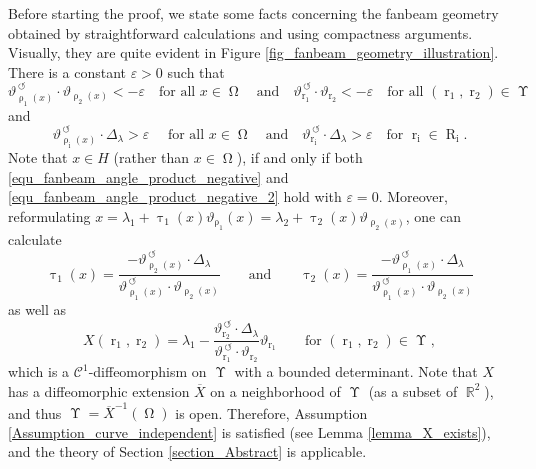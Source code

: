 \documentclass[12pt]{article}
\DeclareMathOperator{\projvariable}{i}
\DeclareMathOperator{\Xgroundset}{\Upsilon}
\DeclareMathOperator{\RR}{{\mathbb{R}}}
\DeclareMathOperator{\rotated}{\,\circlearrowleft}
\DeclareMathOperator{\rayvariable}{r}
\DeclareMathOperator{\raygroundset}{R}
\DeclareMathOperator{\tinverse}{\tau}
\DeclareMathOperator{\rayinverse}{\rho}
\DeclareMathOperator{\imgdom}{{\Omega}}
\begin{document}
Before starting the proof, we state some facts concerning the fanbeam geometry obtained by straightforward calculations and using compactness arguments. Visually, they are quite evident in Figure \ref{fig_fanbeam_geometry_illustration}.
There is a constant $\varepsilon>0$ such that
\begin{equation}\label{equ_fanbeam_angle_product_negative}
\vartheta_{\rayinverse_1(x)}^{\rotated}\cdot \vartheta_{\rayinverse_2(x)} {<}-\varepsilon  \quad \text{for all }x\in \imgdom \quad \text{and} \quad
\vartheta_{\rayvariable_1}^{\rotated}\cdot \vartheta_{\rayvariable_2} {<}-\varepsilon  \quad \text{for all }(\rayvariable_1,\rayvariable_2)\in \Xgroundset
\end{equation}
and
\begin{equation}\label{equ_fanbeam_angle_product_negative_2}
\vartheta_{\rayinverse_{\projvariable}(x)}^{\rotated} \cdot \Delta_\lambda > \varepsilon \quad \text{ for all }x\in \imgdom \quad \text{and} \quad  \vartheta_{\rayvariable_{\projvariable}}^{\rotated} \cdot \Delta_\lambda > \varepsilon \quad \text{for }\rayvariable_{\projvariable}\in \raygroundset_{\projvariable}.
\end{equation}
Note that $x\in H$ (rather than $x\in \imgdom$), if and only if both \eqref{equ_fanbeam_angle_product_negative} and \eqref{equ_fanbeam_angle_product_negative_2} hold with $\varepsilon=0$.
Moreover, reformulating $x=\lambda_1+\tinverse_1(x) \vartheta_{\rayinverse_1}(x) = \lambda_2+\tinverse_2(x) \vartheta_{\rayinverse_2(x)}$, one can calculate
\begin{equation}
\label{equ_Fanbeam_determining_t}
\tinverse_1(x)=
\frac{-\vartheta^{\rotated}_{\rayinverse_2(x)} \cdot \Delta_\lambda }{\vartheta^{\rotated}_{\rayinverse_1(x)} \cdot \vartheta_{\rayinverse_2(x)}} \qquad \text{and} \qquad 
\tinverse_2(x)= \frac{-\vartheta^{\rotated}_{\rayinverse_1(x)} \cdot\Delta_\lambda }{\vartheta^{\rotated}_{\rayinverse_1(x)} \cdot \vartheta_{\rayinverse_2(x)}}
\end{equation}
as well as
\begin{equation}\label{equ_fanbeam_X}
X(\rayvariable_1,\rayvariable_2) = \lambda_1 - \frac{ \vartheta^{\rotated}_{\rayvariable_2}\cdot \Delta_\lambda }{\vartheta^{\rotated}_{\rayvariable_1}\cdot \vartheta_{\rayvariable_2}} \vartheta_{\rayvariable_1} \qquad \text{for }(\rayvariable_1,\rayvariable_2)\in \Xgroundset,
\end{equation}
which is a $\mathcal{C}^1$-diffeomorphism on $\Xgroundset$ with a bounded determinant. Note that $X$ has a diffeomorphic extension $\overline X$ on a neighborhood of $\Xgroundset$ (as a subset of $\RR^2$), and thus $\Xgroundset=\overline X^{-1}(\imgdom)$ is open.
Therefore,   Assumption \ref{Assumption_curve_independent} is satisfied (see Lemma \ref{lemma_X_exists}), and the theory of Section \ref{section_Abstract} is applicable. 
 
\end{document}
